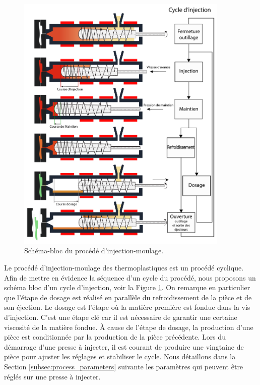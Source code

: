 \begin{figure}[hbtp]
	\centering
	\includegraphics[width=0.9\textwidth,height=\textheight,keepaspectratio]{../Chap1/Figures/SAPRISTI_Schema-cycle.pdf}
	\caption{Schéma-bloc du procédé d'injection-moulage.}
	\label{fig:cycle_injection}
\end{figure}

Le procédé d'injection-moulage des thermoplastiques est un procédé cyclique.
Afin de mettre en évidence la séquence d’un cycle du procédé, nous proposons un schéma bloc d’un cycle d’injection, voir la Figure \ref{fig:cycle_injection}.
On remarque en particulier que l'étape de dosage est réalisé en parallèle du refroidissement de la pièce et de son éjection.
Le dosage est l'étape où la matière première est fondue dans la vis d'injection.
C'est une étape clé car il est nécessaire de garantir une certaine viscosité de la matière fondue.
À cause de l'étape de dosage, la production d'une pièce est conditionnée par la production de la pièce précédente.
Lors du démarrage d'une presse à injecter, il est courant de produire une vingtaine de pièce pour ajuster les réglages et stabiliser le cycle.
Nous détaillons dans la Section \ref{subsec:process_parameters} suivante les paramètres qui peuvent être réglés sur une presse à injecter.

